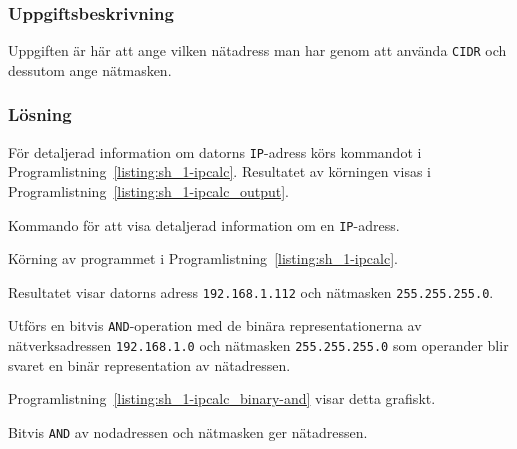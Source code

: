 \subsubsection{Uppgiftsbeskrivning}
Uppgiften är här att ange vilken nätadress man har genom att använda
\texttt{CIDR} och dessutom ange nätmasken.


\subsubsection{Lösning}
För detaljerad information om datorns \texttt{IP}-adress körs kommandot i
Programlistning~\ref{listing:sh_1-ipcalc}. Resultatet av körningen visas i
Programlistning~\ref{listing:sh_1-ipcalc_output}.

\begin{listing}[H]
  \caption{Kommando för att visa detaljerad information om en
           \texttt{IP}-adress.}
  \label{listing:sh_1-ipcalc}
\end{listing}

\begin{listing}[H]
  \caption{Körning av programmet i Programlistning~\ref{listing:sh_1-ipcalc}.}
  \label{listing:sh_1-ipcalc_output}
\end{listing}


Resultatet visar datorns adress \texttt{192.168.1.112} och nätmasken
\texttt{255.255.255.0}.  

Utförs en bitvis \texttt{AND}-operation med de binära representationerna av
nätverksadressen \texttt{192.168.1.0} och nätmasken \texttt{255.255.255.0} som
operander blir svaret en binär representation av nätadressen.

Programlistning~\ref{listing:sh_1-ipcalc_binary-and} visar detta grafiskt.

\begin{listing}[H]
  \caption{Bitvis \texttt{AND} av nodadressen och nätmasken ger nätadressen.}
  \label{listing:sh_1-ipcalc_binary-and}
\end{listing}




